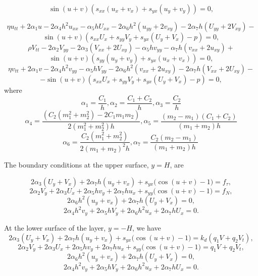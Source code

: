\begin{equation}
	\sin{(u+v)}(s_{xx}(u_x + v_x)+ s_{yx}(u_y + v_y)) = 0, \label{beq1}
\end{equation}

\[
\eta u_{tt} + 2 \alpha_1 u - 2 \alpha_4 h^2 u_{xx} - \alpha_5 h  U_{xx} - 2 \alpha_6 h^2 (u_{yy} + 2 v_{xy}) - 2 \alpha_7 h (U_{yy} + 2 V_{xy}) - 
\]
\begin{equation}
	\sin{(u+v)}(s_{xx}U_x + s_{yy}V_y + s_{yx}(U_y + V_x)-p) = 0, \label{beq2}
\end{equation}
\[
\rho V_{tt} -2 \alpha_2 V_{yy} -2 \alpha_3 \left( V_{xx} + 2 U_{xy}\right) - \alpha_5 h v_{yy} - \alpha_7 h (v_{xx} + 2 u_{xy}) +
\]
\[
\sin{(u+v)}(s_{yy}(u_y + v_y)+ s_{yx}(u_x + v_x)) = 0,
\]
\[
\eta v_{tt} + 2 \alpha_1 v - 2 \alpha_4 h^2 v_{yy} - \alpha_5 h V_{yy} - 2 \alpha_6 h^2 (v_{xx} + 2 u_{xy}) - 2 \alpha_7 h (V_{xx} + 2 U_{xy}) - 
\]
\[
-\sin{(u+v)}(s_{xx}U_x + s_{yy}V_y + s_{yx}(U_y + V_x)-p) = 0,
\]
where
\[ \alpha_1 = \frac{C_1}{h},  \alpha_2 = \frac{C_1+C_2}{h} , 
\alpha_3 = \frac{C_2}{h}
\]
\[ 
\alpha_4 = \frac{\left(C_2\left(m_1^2 + m_2^2\right) - 2C_1 m_1 m_2\right)}{2\left(m_1^2 + m_2^2\right)h} , 
\alpha_5 = \frac{\left(m_2-m_1\right)\left(C_1+C_2\right)}{(m_1+m_2)h} 
\]
\[
\alpha_6 = \frac{C_2 \left(m_1^2+m_2^2\right)}{2\left(m_1+m_2\right)^2h} ,
\alpha_7 = \frac{C_2\left(m_2 - m_1\right)}{(m_1 + m_2)h} \
\] 


The boundary conditions at the upper surface, $y=H$,  are 

\begin{equation}
	2 \alpha_3 (U_y + V_x) + 2 \alpha_7 h (u_y + v_x) + s_{yx}( \cos{(u + v)-1)} = f_{\tau}, \label{bc11}
\end{equation}
\begin{equation}
	2 \alpha_2 V_y + 2 \alpha_3 U_x + 2 \alpha_5 h v_y + 2 \alpha_7 h u_x + s_{yy} (\cos{(u + v)-1)}= f_N,\label{bc12}
\end{equation}
\begin{equation}
	2 \alpha_6 h^2 (u_y + v_x) + 2 \alpha_7 h (U_y + V_x) = 0,\label{bc13}
\end{equation}
\begin{equation}
	2 \alpha_4 h^2 v_y + 2 \alpha_5 h V_y + 2 \alpha_6 h^2 u_x + 2 \alpha_7 h U_x = 0. \label{bc14}
\end{equation}

At the lower surface of the layer, $y= - H$, we have 
\begin{equation}
	2 \alpha_3 (U_y + V_x) + 2 \alpha_7 h (u_y + v_x) + s_{yx} (\cos{(u + v)-1)} = k_d( q_1 V + q_2 V_t) ,\label{bc21}
\end{equation}
\begin{equation}
	2 \alpha_2 V_y + 2 \alpha_3 U_x + 2 \alpha_5 h v_y + 2 \alpha_7 h u_x + s_{yy} (\cos{(u + v)-1)}= q_1 V +q_2 V_t,\label{bc22}
\end{equation}
\begin{equation}
	2 \alpha_6 h^2 (u_y + v_x) + 2 \alpha_7 h (U_y + V_x) = 0, \label{bc23}
\end{equation}
\begin{equation}
	2 \alpha_4 h^2 v_y + 2 \alpha_5 h V_y + 2 \alpha_6 h^2 u_x + 2 \alpha_7 h U_x = 0 . \label{bc24}
\end{equation}

